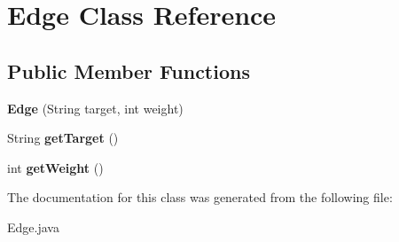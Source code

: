 \hypertarget{class_edge}{\section{Edge Class Reference}
\label{class_edge}
}
\subsection*{Public Member Functions}
\begin{DoxyCompactItemize}
\item 
\hypertarget{class_edge_a2e0bc2ab99efaff142522be150f0d010}{{\bfseries Edge} (String target, int weight)}\label{class_edge_a2e0bc2ab99efaff142522be150f0d010}

\item 
\hypertarget{class_edge_a1157117272aaebf06828ab52e915b100}{String {\bfseries get\+Target} ()}\label{class_edge_a1157117272aaebf06828ab52e915b100}

\item 
\hypertarget{class_edge_a963d963b098f2329738cde01942be520}{int {\bfseries get\+Weight} ()}\label{class_edge_a963d963b098f2329738cde01942be520}

\end{DoxyCompactItemize}


The documentation for this class was generated from the following file\+:\begin{DoxyCompactItemize}
\item 
Edge.\+java\end{DoxyCompactItemize}
